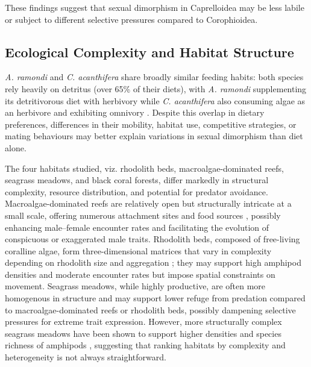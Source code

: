 \documentclass[journal,article,submit,pdftex,moreauthors]{Definitions/mdpi}
\begin{document}
    		These findings suggest that sexual dimorphism in Caprelloidea may be less labile or subject to different selective pressures compared to Corophioidea.
    		
    		\subsection{Ecological Complexity and Habitat Structure}
    		
    		\textit{A. ramondi}  and \textit{C. acanthifera} share broadly similar feeding habits: both species rely heavily on detritus (over 65\% of their diets), with \textit{A. ramondi} supplementing its detritivorous diet with herbivory \citep{castejon2019feeding, guerra2004fatty} while \textit{C. acanthifera} also consuming algae as an herbivore and exhibiting omnivory \citep{michel2015dominant}. Despite this overlap in dietary preferences, differences in their mobility, habitat use, competitive strategies, or mating behaviours may better explain variations in sexual dimorphism than diet alone. 
    		
    		The four habitats studied, viz. rhodolith beds, macroalgae-dominated reefs, seagrass meadows, and black coral forests, differ markedly in structural complexity, resource distribution, and potential for predator avoidance. Macroalgae-dominated reefs are relatively open but structurally intricate at a small scale, offering numerous attachment sites and food sources \citep{lippert2001macrofauna}, possibly enhancing male–female encounter rates and facilitating the evolution of conspicuous or exaggerated male traits. Rhodolith beds, composed of free-living coralline algae, form three-dimensional matrices that vary in complexity depending on rhodolith size and aggregation \citep{NavarroMayoral2020}; they may support high amphipod densities and moderate encounter rates but impose spatial constraints on movement. Seagrass meadows, while highly productive, are often more homogenous in structure \citep{barbera2005spatial} and may support lower refuge from predation compared to macroalgae-dominated reefs or rhodolith beds, possibly dampening selective pressures for extreme trait expression. However, more structurally complex seagrass meadows have been shown to support higher densities and species richness of amphipods \citep{navarro2023drivers}, suggesting that ranking habitats by complexity and heterogeneity is not always straightforward. 
    		
\end{document}
